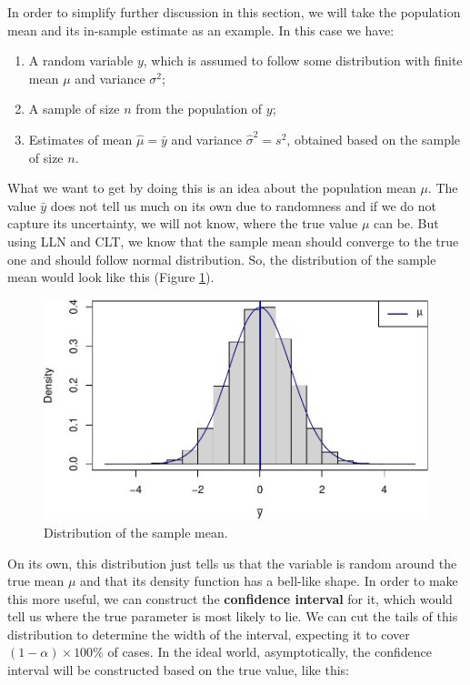 \documentclass[
]{book}
\providecommand{\tightlist}{%
  \setlength{\itemsep}{0pt}\setlength{\parskip}{0pt}}
\theoremstyle{definition}
\theoremstyle{definition}
\theoremstyle{definition}
\theoremstyle{definition}
\theoremstyle{remark}
\begin{document}
In order to simplify further discussion in this section, we will take the population mean and its in-sample estimate as an example. In this case we have:

\begin{enumerate}
\def\labelenumi{\arabic{enumi}.}
\tightlist
\item
  A random variable \(y\), which is assumed to follow some distribution with finite mean \(\mu\) and variance \(\sigma^2\);
\item
  A sample of size \(n\) from the population of \(y\);
\item
  Estimates of mean \(\hat{\mu}=\bar{y}\) and variance \(\hat{\sigma}^2 = s^2\), obtained based on the sample of size \(n\).
\end{enumerate}

What we want to get by doing this is an idea about the population mean \(\mu\). The value \(\bar{y}\) does not tell us much on its own due to randomness and if we do not capture its uncertainty, we will not know, where the true value \(\mu\) can be. But using LLN and CLT, we know that the sample mean should converge to the true one and should follow normal distribution. So, the distribution of the sample mean would look like this (Figure \ref{fig:normalCurveBasic}).

\begin{figure}
\centering
\includegraphics{Svetunkov---Statistics-for-Business-Analytics_files/figure-latex/normalCurveBasic-1.pdf}
\caption{\label{fig:normalCurveBasic}Distribution of the sample mean.}
\end{figure}

On its own, this distribution just tells us that the variable is random around the true mean \(\mu\) and that its density function has a bell-like shape. In order to make this more useful, we can construct the \textbf{confidence interval} for it, which would tell us where the true parameter is most likely to lie. We can cut the tails of this distribution to determine the width of the interval, expecting it to cover \((1-\alpha)\times 100\)\% of cases. In the ideal world, asymptotically, the confidence interval will be constructed based on the true value, like this:
\end{document}
